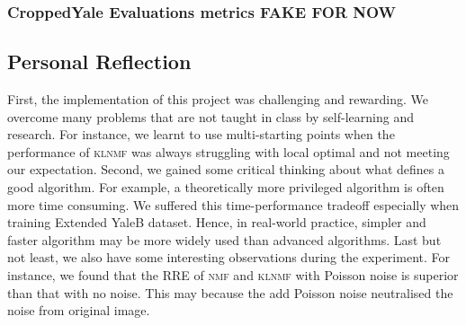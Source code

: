 \subsubsection{{CroppedYale} Evaluations metrics FAKE FOR NOW}
\begin{table}
\caption{Average of evaluations metrics over 40 simulations using CroppedYale data set. The 95\% confidence intervals are calculated using bootstrap.}
\end{table}
\subsection{Personal Reflection}
First, the implementation of this project was challenging and rewarding. We overcome many problems that are not taught in class by self-learning and research. For instance, we learnt to use multi-starting points when the performance of \textsc{klnmf} was always struggling with local optimal and not meeting our expectation.
Second, we gained some critical thinking about what defines a good algorithm. For example, a theoretically more privileged algorithm is often more time consuming. We suffered this time-performance tradeoff especially when training Extended YaleB dataset. Hence, in real-world practice, simpler and faster algorithm may be more widely used than advanced algorithms.
Last but not least, we also have some interesting observations during the experiment. For instance, we found that the RRE of \textsc{nmf} and \textsc{klnmf} with Poisson noise is superior than that with no noise. This may because the add Poisson noise neutralised the noise from original image.
